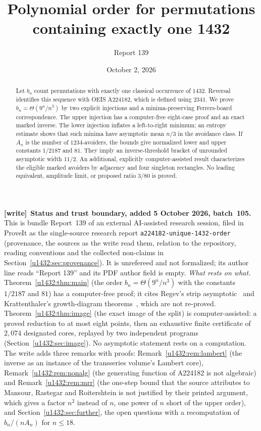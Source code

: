 \documentclass[11pt]{article}
\title{Polynomial order for permutations containing exactly one 1432}
\author{Report 139}
\date{October 2, 2026}
\theoremstyle{remark}\newtheorem{remark}[theorem]{Remark}
\newcommand{\file}[1]{\nolinkurl{#1}}
\newenvironment{writenote}[1][]{\par\smallskip\begingroup\small
 \noindent\textbf{[write]}\if\relax\detokenize{#1}\relax\else~\textbf{#1.}\fi\ }%
 {\par\endgroup\smallskip}
\begin{document}
\maketitle
\begin{abstract}
Let $b_n$ count permutations with exactly one classical occurrence of $1432$.
Reversal identifies this sequence with OEIS A224182, which is defined using
$2341$. We prove $b_n=\Theta(9^n/n^3)$ by two explicit injections and a
minima-preserving Ferrers-board correspondence. The upper injection has a
computer-free eight-case proof and an exact marked inverse. The lower
injection inflates a left-to-right minimum; an entropy estimate shows that
such minima have asymptotic mean $n/3$ in the avoidance class. If $A_n$
is the number of $1234$-avoiders, the bounds give normalized lower and upper
constants $1/2187$ and $81$. They imply an inverse-threshold bracket of
unrounded asymptotic width $11/2$. An additional, explicitly computer-assisted
result characterizes the eligible marked avoiders by adjacency and four
singleton rectangles. No leading equivalent, amplitude limit, or proposed
ratio $3/80$ is proved.
\end{abstract}

\begin{writenote}[Status and trust boundary, added 5 October 2026, batch~105]
This is bundle Report~139 of an external AI-assisted research session,
filed in ProveIt as the single-source research report
\file{a224182-unique-1432-order} (provenance, the sources as the write read
them, relation to the repository, reading conventions and the collected
non-claims in Section~\ref{u1432:sec:provenance}). It is unrefereed and not
formalized; its author line reads ``Report 139'' and its PDF author field is
empty. \emph{What rests on what.} Theorem~\ref{u1432:thm:main} (the order
$b_n=\Theta(9^n/n^3)$ with the constants $1/2187$ and $81$) has a
computer-free proof; it cites Regev's strip asymptotic~\cite{Regev} and
Krattenthaler's growth-diagram theorems~\cite{Kratt}, which are not
re-proved. Theorem~\ref{u1432:thm:image} (the exact image of the split) is
computer-assisted: a proved reduction to at most eight points, then an
exhaustive finite certificate of $2{,}074$ designated cores, replayed by two
independent programs (Section~\ref{u1432:sec:image}). No asymptotic statement
rests on a computation. The write adds three remarks with proofs:
Remark~\ref{u1432:rem:lambert} (the inverse as an instance of the
transseries volume's Lambert core), Remark~\ref{u1432:rem:nonalg} (the
generating function of A224182 is not algebraic) and
Remark~\ref{u1432:rem:mrr} (the one-step bound that the source attributes
to Mansour, Rastegar and Roitershtein is not justified by their printed
argument, which gives a factor $n^2$ instead of $n$, one power of $n$ short
of the upper order), and Section~\ref{u1432:sec:further}, the open questions
with a recomputation of $b_n/(nA_n)$ for $n\le18$.
\end{writenote}
{\small\setlength{\parskip}{0pt}\tableofcontents}
\end{document}
